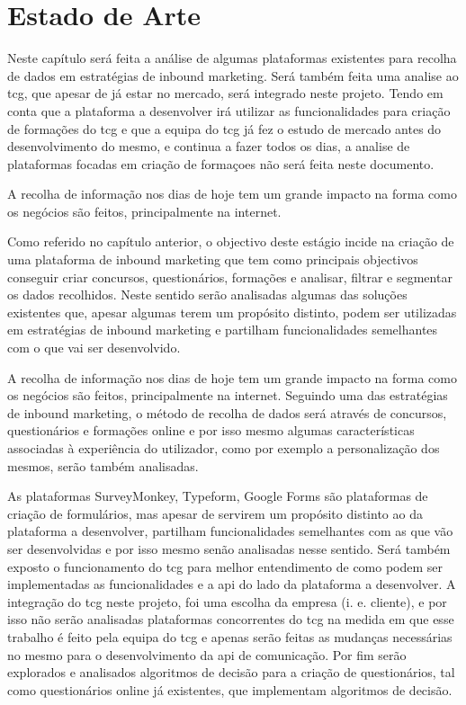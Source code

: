 \chapter{Estado de Arte}
\label{sec:estado-arte}

Neste capítulo será feita a análise de algumas plataformas existentes para recolha de dados em estratégias de inbound marketing. Será também feita uma analise ao \acrshort{tcg}, que apesar de já estar no mercado, será integrado neste projeto. Tendo em conta que a plataforma a desenvolver irá utilizar as funcionalidades para criação de formações do \acrshort{tcg} e que a equipa do \acrlong{tcg} já fez o estudo de mercado antes do desenvolvimento do mesmo, e continua a fazer todos os dias, a analise de plataformas focadas em criação de formaçoes não será feita neste documento. 

A recolha de informação nos dias de hoje tem um grande impacto na forma como os negócios são feitos, principalmente na internet.

Como referido no capítulo anterior, o objectivo deste estágio incide na criação de uma plataforma de inbound marketing que tem como principais objectivos conseguir criar concursos, questionários, formações e analisar, filtrar e segmentar os dados recolhidos. Neste sentido serão analisadas algumas das soluções existentes que, apesar algumas terem um propósito distinto, podem ser utilizadas em estratégias de inbound marketing e partilham funcionalidades semelhantes com o que vai ser desenvolvido. 

A recolha de informação nos dias de hoje tem um grande impacto na forma como os negócios são feitos, principalmente na internet. Seguindo uma das estratégias de inbound marketing, o método de recolha de dados será através de concursos, questionários e formações online e por isso mesmo algumas características associadas à experiência do utilizador, como por exemplo a personalização dos mesmos, serão também analisadas.


As plataformas SurveyMonkey\cite{surveymonkey}, Typeform\cite{typeform}, Google Forms\cite{googleform} são plataformas de criação de formulários, mas apesar de servirem um propósito distinto ao da plataforma a desenvolver, partilham funcionalidades semelhantes com as que vão ser desenvolvidas e por isso mesmo senão analisadas nesse sentido. Será também exposto o funcionamento do \acrshort{tcg} para melhor entendimento de como podem ser implementadas as funcionalidades e a \acrshort{api} do lado da plataforma a desenvolver. A integração do \acrshort{tcg} neste projeto, foi uma escolha da empresa (i. e. cliente), e por isso não serão analisadas plataformas concorrentes do \acrshort{tcg} na medida em que esse trabalho é feito pela equipa do \acrshort{tcg} e apenas serão feitas as mudanças necessárias no mesmo para o desenvolvimento da \acrshort{api} de comunicação. Por fim serão explorados e analisados algoritmos de decisão para a criação de questionários, tal como questionários online já existentes, que implementam algoritmos de decisão.

